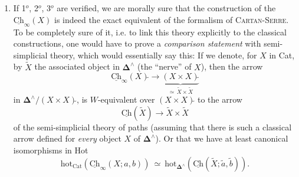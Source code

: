 \documentclass[11pt]{article}
\newcommand{\uCh}{\underline{\mathrm{Ch}}}
\newcommand{\hot}{\mathrm{hot}}
\begin{document}
\begin{enumerate}[label={}, leftmargin=*]
\item[5$^o$)] If 1$^o$, 2$^o$, 3$^o$ are verified, we are morally sure that the construction of the $\uCh_\infty(X)$ is indeed the exact equivalent of the formalism of \textsc{Cartan-Serre}. To be completely sure of it, i.e. to link this theory explicitly to the classical constructions, one would have to prove a \textit{comparison statement} with semi-simplicial theory, which would essentially say this: If we denote, for $X$ in Cat, by $\tilde{X}$ the associated object in $\mathbf{\Delta}^\wedge$ (the ``nerve'' of $X$), then the arrow
\[
\uCh_\infty(X)\tilde{}\longrightarrow\underbrace{(X\times X)\tilde{}}_{\simeq\,\tilde{X}\times\tilde{X}}
\]
in $\mathbf{\Delta}^\wedge/(X\times X)\tilde{}$, is $W$-equivalent over $(X\times X)\tilde{}$ to the arrow
\[
\uCh(\tilde{X})\longrightarrow\tilde{X}\times\tilde{X}
\]
of the semi-simplicial theory of paths (assuming that there is such a classical arrow defined for \textit{every} object $X$ of $\mathbf{\Delta}^\wedge$). Or that we have at least canonical isomorphisms in Hot
\[
\hot_{\mathrm{Cat}}(\uCh_\infty(X;a,b))\ \simeq\ \hot_{\mathbf{\Delta}^\wedge}(\uCh(\tilde{X};\tilde{a},\tilde{b})).
\]
\end{enumerate}
\end{document}
